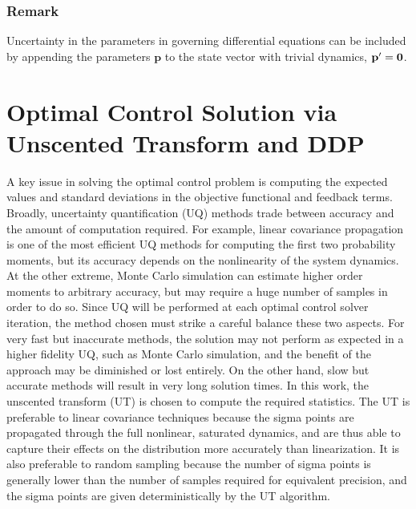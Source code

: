\documentclass[journal ]{new-aiaa}
\newcommand{\state}{\ensuremath{\mathbf{x}}}
\newcommand{\ur}{\ensuremath{u_{\mathrm{ref}}}}
\newcommand{\param}{\ensuremath{\mathbf{p}}}
\newcommand{\E}[1]{\mathbb{E}\left[#1\right]}
\newcommand{\V}[1]{\mathbb{V}[#1]}
\newcommand{\cov}{C}
\begin{document}
\subsubsection*{Remark} Uncertainty in the parameters in governing differential equations can be included by appending the parameters $\param$ to the state vector with trivial dynamics, $\param'=\bf0$.

\section*{Optimal Control Solution via Unscented Transform and DDP}
A key issue in solving the optimal control problem is computing the expected values and standard deviations in the objective functional and feedback terms. Broadly, uncertainty quantification (UQ) methods trade between accuracy and the amount of computation required. For example, linear covariance propagation is one of the most efficient UQ methods for computing the first two probability moments, but its accuracy depends on the nonlinearity of the system dynamics. At the other extreme, Monte Carlo simulation can estimate higher order moments to arbitrary accuracy, but may require a huge number of samples in order to do so. Since UQ will be performed at each optimal control solver iteration, the method chosen must strike a careful balance these two aspects. For very fast but inaccurate methods, the solution may not perform as expected in a higher fidelity UQ, such as Monte Carlo simulation, and the benefit of the approach may be diminished or lost entirely. On the other hand, slow but accurate methods will result in very long solution times. In this work, the unscented transform (UT) \cite{UT1997} is chosen to compute the required statistics. The UT is preferable to linear covariance techniques because the sigma points are propagated through the full nonlinear, saturated dynamics, and are thus able to capture their effects on the distribution more accurately than linearization. 
It is also preferable to random sampling because the number of sigma points is generally lower than the number of samples required for equivalent precision, and the sigma points are given deterministically by the UT algorithm. %
\end{document}
